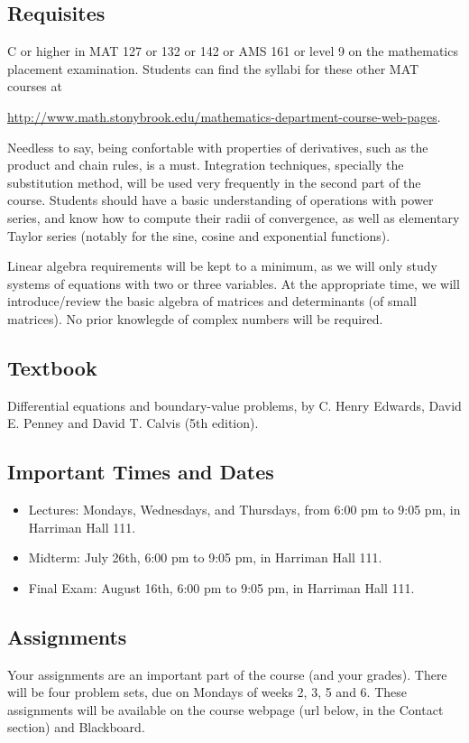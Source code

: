 \documentclass[11pt]{amsart}
\numberwithin{equation}{section}
\begin{document}
\subsection{Requisites}
C or higher in MAT 127 or 132 or 142 or AMS 161 or level 9 on the mathematics placement examination. Students can find the syllabi for these other MAT courses at 
\begin{center}
\url{http://www.math.stonybrook.edu/mathematics-department-course-web-pages}.
\end{center}

Needless to say, being confortable with properties of derivatives, such as the product and chain rules, is a must. Integration techniques, specially the substitution method, will be used very frequently in the second part of the course. Students should have a basic understanding of operations with power series, and know how to compute their radii of convergence, as well as elementary Taylor series (notably for the sine, cosine and exponential functions).

      Linear algebra requirements will be kept to a minimum, as we will only study systems of equations with two or three variables. At the appropriate time, we will introduce/review the basic algebra of matrices and determinants (of small matrices). No prior knowlegde of complex numbers will be required.
      
\subsection{Textbook}
Differential equations and boundary-value problems, by C. Henry Edwards, David E. Penney and David T. Calvis (5th edition). 

\subsection{Important Times and Dates}
\begin{itemize}
\item Lectures: Mondays, Wednesdays, and Thursdays, from 6:00 pm to 9:05 pm, in Harriman Hall 111.
\item Midterm: July 26th, 6:00 pm to 9:05 pm, in Harriman Hall 111. 
\item Final Exam: August 16th, 6:00 pm to 9:05 pm, in Harriman Hall 111.
\end{itemize}

\subsection{Assignments}
 Your assignments are an important part of the course (and your grades). There will be four problem sets, due on Mondays of weeks 2, 3, 5 and 6. These assignments will be available on the course webpage (url below, in the Contact section) and Blackboard. 
 
\end{document}
